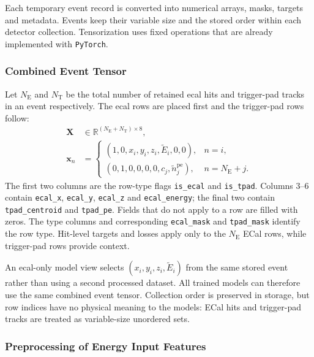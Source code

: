 Each temporary event record is converted into numerical arrays, masks, targets and metadata. Events keep their variable size and the stored order within each detector collection. Tensorization uses fixed operations that are already implemented with \texttt{PyTorch}.

\subsubsection{Combined Event Tensor}

Let \(N_{\mathrm{E}}\) and \(N_{\mathrm{T}}\) be the total number of retained
\gls{ecal} hits and trigger-pad tracks in an event respectively. The \gls{ecal} rows are placed
first and the trigger-pad rows follow:
\begin{equation}
    \begin{aligned}
        \mathbf{X}
        &\in
        \mathbb{R}^{(N_{\mathrm{E}}+N_{\mathrm{T}})\times 8},\\
        \mathbf{x}_n
        &=
        \begin{cases}
            (1,0,x_i,y_i,z_i,\widetilde{E}_i,0,0),
            & n=i, \\[2mm]
            (0,1,0,0,0,0,c_j,\widetilde{n}^{\mathrm{pe}}_j),
            & n=N_{\mathrm{E}}+j .
        \end{cases}
    \end{aligned}
    \label{eq:combined_event_tensor}
\end{equation}
The first two columns are the row-type flags \texttt{is\_ecal} and
\texttt{is\_tpad}. Columns 3--6 contain \texttt{ecal\_x},
\texttt{ecal\_y}, \texttt{ecal\_z} and \texttt{ecal\_energy}; the final two
contain \texttt{tpad\_centroid} and \texttt{tpad\_pe}. Fields that do not
apply to a row are filled with zeros. The type columns and corresponding
\texttt{ecal\_mask} and \texttt{tpad\_mask} identify the row type. Hit-level
targets and losses apply only to the \(N_{\mathrm{E}}\) ECal rows, while
trigger-pad rows provide context.

An \gls{ecal}-only model view selects
\((x_i,y_i,z_i,\widetilde{E}_i)\) from the same stored event rather than
using a second processed dataset. All trained models can therefore use the
same combined event tensor. Collection order is preserved in storage, but row
indices have no physical meaning to the models: ECal hits and trigger-pad
tracks are treated as variable-size unordered sets.

\subsubsection{Preprocessing of Energy Input Features}
\label{sec:preprocess}

